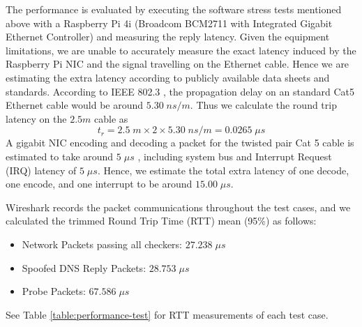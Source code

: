 \documentclass[a4paper]{report}
\begin{document}
The performance is evaluated by executing the software stress tests mentioned above with a Raspberry Pi 4i (Broadcom BCM2711 with Integrated Gigabit Ethernet Controller) and measuring the reply latency. Given the equipment limitations, we are unable to accurately measure the exact latency induced by the Raspberry Pi NIC and the signal travelling on the Ethernet cable. Hence we are estimating the extra latency according to publicly available data sheets and standards. According to IEEE 802.3 \cite{ieee802.3ethernet-2018}, the propagation delay on an standard Cat5 Ethernet cable would be around $5.30 \; ns/m$. Thus we calculate the round trip latency on the $2.5m$ cable as  
$$
t_r = 2.5\; m \times 2 \times 5.30\; ns /m = 0.0265 \; \mu s
$$ 
A gigabit NIC encoding and decoding a packet for the twisted pair Cat 5 cable is estimated to take around $5 \; \mu s$ \cite{texas-instruments-dp83848x}, including system bus and Interrupt Request (IRQ) latency of $5 \; \mu s$. Hence, we estimate the total extra latency of one decode, one encode, and one interrupt to be around $15.00\; \mu s$.

Wireshark records the packet communications throughout the test cases, and we calculated the trimmed Round Trip Time (RTT) mean (95\%) as follows:
\begin{itemize}[noitemsep]
    \item Network Packets passing all checkers: $27.238\; \mu s$
    \item Spoofed DNS Reply Packets: $28.753\; \mu s$
    \item Probe Packets: $67.586\; \mu s$
\end{itemize}
See Table \ref{table:performance-test} for RTT measurements of each test case.
\end{document}
